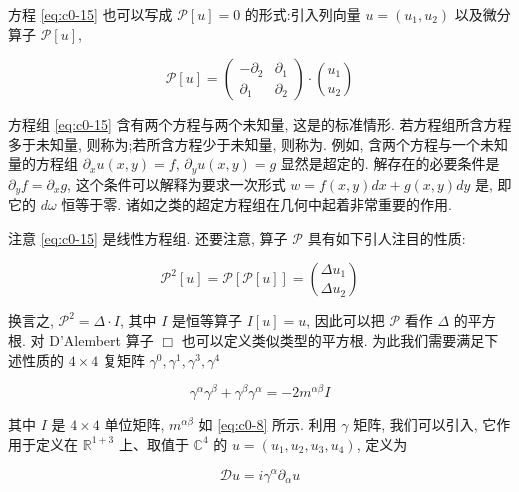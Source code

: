 方程 \eqref{eq:c0-15} 也可以写成 $\mathcal{P}[u] = 0$ 的形式:引入列向量 $u = (u_{1}, u_{2})$ 以及微分算子 $\mathcal{P}[u]$,

\[
\mathcal{P}[u] = \begin{pmatrix} -\partial_{2} & \partial_{1} \\ \partial_{1} & \partial_{2} \end{pmatrix} \cdot \binom{u_{1}}{u_{2}}
\]

方程组 \eqref{eq:c0-15} 含有两个方程与两个未知量, 这是的标准情形.
若方程组所含方程多于未知量, 则称为;若所含方程少于未知量, 则称为.
例如, 含两个方程与一个未知量的方程组 $\partial_{x} u(x, y) = f$, $\partial_{y} u(x, y) = g$ 显然是超定的.
解存在的必要条件是 $\partial_{y} f = \partial_{x} g$, 这个条件可以解释为要求一次形式 $w = f(x, y) d x + g(x, y) d y$ 是, 即它的 $d \omega$ 恒等于零.
诸如之类的超定方程组在几何中起着非常重要的作用.

注意 \eqref{eq:c0-15} 是线性方程组.
还要注意, 算子 $\mathcal{P}$ 具有如下引人注目的性质:

\[
\mathcal{P}^{2}[u] = \mathcal{P}[\mathcal{P}[u]] = \binom{\Delta u_{1}}{\Delta u_{2}}
\]

换言之, $\mathcal{P}^{2} = \Delta \cdot I$, 其中 $I$ 是恒等算子 $I[u] = u$, 因此可以把 $\mathcal{P}$ 看作 $\Delta$ 的平方根.
对 D'Alembert 算子 $\Box$ 也可以定义类似类型的平方根.
为此我们需要满足下述性质的 $4 \times 4$ 复矩阵 $\gamma^{0}, \gamma^{1}, \gamma^{3}, \gamma^{4}$

\begin{equation}\label{eq:c0-17}
\gamma^{\alpha} \gamma^{\beta} + \gamma^{\beta} \gamma^{\alpha} = -2 m^{\alpha \beta} I
\end{equation}

其中 $I$ 是 $4 \times 4$ 单位矩阵, $m^{\alpha \beta}$ 如 \eqref{eq:c0-8} 所示.
利用 $\gamma$ 矩阵, 我们可以引入, 它作用于定义在 $\mathbb{R}^{1+3}$ 上、取值于 $\mathbb{C}^{4}$ 的 $u = (u_{1}, u_{2}, u_{3}, u_{4})$, 定义为

\begin{equation}\label{eq:c0-18}
\mathcal{D} u = i \gamma^{\alpha} \partial_{\alpha} u
\end{equation}

